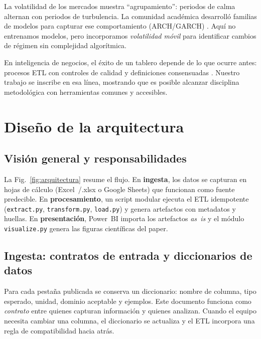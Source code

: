 \documentclass[conference]{IEEEtran}
\begin{document}
La volatilidad de los mercados muestra “agrupamiento”: periodos de calma alternan con periodos de turbulencia. La comunidad académica desarrolló familias de modelos para capturar ese comportamiento (ARCH/GARCH) \cite{barbosa2019,gaona2020}. Aquí no entrenamos modelos, pero incorporamos \emph{volatilidad móvil} para identificar cambios de régimen sin complejidad algorítmica.

En inteligencia de negocios, el éxito de un tablero depende de lo que ocurre antes: procesos ETL con controles de calidad y definiciones consensuadas \cite{novoa2019}. Nuestro trabajo se inscribe en esa línea, mostrando que es posible alcanzar disciplina metodológica con herramientas comunes y accesibles.

\section{Diseño de la arquitectura}
\subsection{Visión general y responsabilidades}
La Fig.~\ref{fig:arquitectura} resume el flujo. En \textbf{ingesta}, los datos se capturan en hojas de cálculo (Excel~/.xlsx o Google Sheets) que funcionan como fuente predecible. En \textbf{procesamiento}, un script modular ejecuta el ETL idempotente (\texttt{extract.py}, \texttt{transform.py}, \texttt{load.py}) y genera artefactos con metadatos y huellas. En \textbf{presentación}, Power~BI importa los artefactos \emph{as~is} y el módulo \texttt{visualize.py} genera las figuras científicas del paper.

\subsection{Ingesta: contratos de entrada y diccionarios de datos}
Para cada pestaña publicada se conserva un diccionario: nombre de columna, tipo esperado, unidad, dominio aceptable y ejemplos. Este documento funciona como \emph{contrato} entre quienes capturan información y quienes analizan. Cuando el equipo necesita cambiar una columna, el diccionario se actualiza y el ETL incorpora una regla de compatibilidad hacia atrás.
\end{document}
